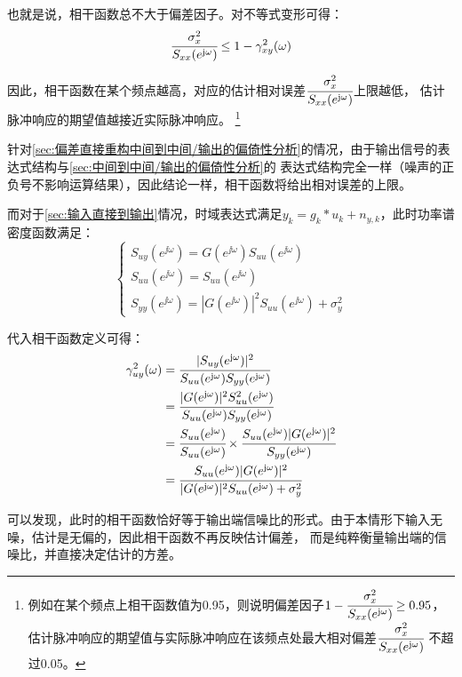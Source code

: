 也就是说，相干函数总不大于偏差因子。对不等式变形可得：
\begin{equation*}
    \cfrac{\sigma_{x}^2}{S_{xx}(e^{\mathrm{j}\omega})} \le 1-\gamma_{xy}^2(\omega)
\end{equation*}

因此，相干函数在某个频点越高，对应的估计相对误差\(\cfrac{\sigma_{x}^2}{S_{xx}(e^{\mathrm{j}\omega})}\)上限越低，
估计脉冲响应的期望值越接近实际脉冲响应。
\footnote{例如在某个频点上相干函数值为0.95，则说明偏差因子\(1-\cfrac{\sigma_x^2}{S_{xx}(e^{\mathrm{j}\omega})}
\ge 0.95\)，估计脉冲响应的期望值与实际脉冲响应在该频点处最大相对偏差\(\cfrac{\sigma_x^2}{S_{xx}(e^{\mathrm{j}\omega})}\)
不超过0.05。}

针对\ref{sec:偏差直接重构中间到中间/输出的偏倚性分析}的情况，由于输出信号的表达式结构与\ref{sec:中间到中间/输出的偏倚性分析}的
表达式结构完全一样（噪声的正负号不影响运算结果），因此结论一样，相干函数将给出相对误差的上限。

而对于\ref{sec:输入直接到输出}情况，时域表达式满足\(y_k=g_k*u_k+n_{y,k}\)，此时功率谱密度函数满足：
\begin{equation*}
    \begin{cases}
        S_{uy}(e^{\jj\omega})=G(e^{\jj\omega})S_{uu}(e^{\jj\omega})\\
        S_{uu}(e^{\jj\omega})=S_{uu}(e^{\jj\omega})\\
        S_{yy}(e^{\jj\omega})=|G(e^{\jj\omega})|^2S_{uu}(e^{\jj\omega})+\sigma_y^2
    \end{cases}
\end{equation*}

代入相干函数定义可得：
\begin{align*}
    \gamma_{uy}^2(\omega)&=\cfrac{|S_{uy}(e^{\mathrm{j}\omega})|^2}{S_{uu}(e^{\mathrm{j}\omega})S_{yy}(e^{\mathrm{j}\omega})}\\
    &=\cfrac{|G(e^{\mathrm{j}\omega})|^2S_{uu}^2(e^{\mathrm{j}\omega})}
    {S_{uu}(e^{\mathrm{j}\omega})S_{yy}(e^{\mathrm{j}\omega})}\\
    &=\cfrac{S_{uu}(e^{\mathrm{j}\omega})}{S_{uu}(e^{\mathrm{j}\omega})}\times
    \cfrac{S_{uu}(e^{\mathrm{j}\omega})|G(e^{\mathrm{j}\omega})|^2}{S_{yy}(e^{\mathrm{j}\omega})}\\
    &=\cfrac{S_{uu}(e^{\mathrm{j}\omega})|G(e^{\mathrm{j}\omega})|^2}
    {|G(e^{\mathrm{j}\omega})|^2S_{uu}(e^{\mathrm{j}\omega})+\sigma_y^2}
\end{align*}

可以发现，此时的相干函数恰好等于输出端信噪比的形式。由于本情形下输入无噪，估计是无偏的，因此相干函数不再反映估计偏差，
而是纯粹衡量输出端的信噪比，并直接决定估计的方差。

